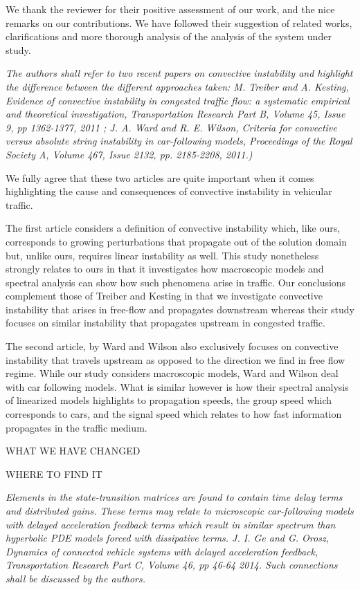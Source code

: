 \documentclass{article}
\begin{document}
We thank the reviewer for their positive assessment of our work, and the nice remarks on our contributions. We have followed their suggestion of related works, clarifications and more thorough analysis of the analysis of the system under study.\\

\bigskip{}

\emph{
The authors shall refer to two recent papers on convective instability and highlight the difference between the different approaches taken: M. Treiber and A. Kesting, Evidence of convective instability in congested traffic flow: a systematic empirical and theoretical investigation, Transportation Research Part B, Volume 45, Issue 9, pp 1362-1377, 2011 ; J. A. Ward and R. E. Wilson, Criteria for convective versus absolute string instability in car-following models, Proceedings of the Royal Society A, Volume 467, Issue 2132, pp. 2185-2208, 2011.)
}

We fully agree that these two articles are quite important when it comes highlighting the cause and consequences of convective instability in vehicular traffic.

The first article considers a definition of convective instability which, like ours, corresponds to growing perturbations that propagate out of the solution domain but, unlike ours, requires linear instability as well. This study nonetheless strongly relates to ours in that it investigates how macroscopic models and spectral analysis can show how such phenomena arise in traffic. Our conclusions complement those of Treiber and Kesting in that we investigate convective instability that arises in free-flow and propagates downstream whereas their study focuses on similar instability that propagates upstream in congested traffic.

The second article, by Ward and Wilson also exclusively focuses on convective instability that travels upstream as opposed to the direction we find in free flow regime. While our study considers macroscopic models, Ward and Wilson deal with car following models. What is similar however is how their spectral analysis of linearized models highlights to propagation speeds, the group speed which corresponds to cars, and the signal speed which relates to how fast information propagates in the traffic medium.

WHAT WE HAVE CHANGED

WHERE TO FIND IT

\bigskip{}

\emph{
Elements in the state-transition matrices are found to contain time delay terms and distributed gains. These terms may relate to microscopic car-following models with delayed acceleration feedback terms which result in similar spectrum than hyperbolic PDE models forced with dissipative terms. J. I. Ge and G. Orosz, Dynamics of connected vehicle systems with delayed acceleration feedback, Transportation Research Part C, Volume 46, pp 46-64 2014. Such connections shall be discussed by the authors.
}
\end{document}
